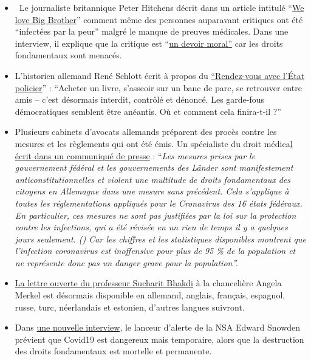 \begin{itemize}
\tightlist
\item
  ~Le journaliste britannique Peter Hitchens décrit dans un article
  intitulé
  ``\href{https://www.firstthings.com/web-exclusives/2020/04/we-love-big-brother}{We
  love Big Brother}'' comment même des personnes auparavant critiques
  ont été ``infectées par la peur'' malgré le manque de preuves
  médicales. Dans une interview, il explique que la critique est
  ``\href{https://www.spiked-online.com/podcast-episode/in-this-lockdown-dissent-is-a-moral-duty/}{un
  devoir moral''} car les droits fondamentaux sont menacés.
\item
  L'historien allemand René Schlott écrit à propos du
  \href{https://www.spiegel.de/politik/deutschland/corona-krise-und-buergerrechte-rendezvous-mit-dem-polizeistaat-a-68611322-f4d4-453f-aba5-5ec5a49ae329}{``Rendez-vous
  avec l'État policier}'' : ``Acheter un livre, s'asseoir sur un banc de
  parc, se retrouver entre amis -- c'est désormais interdit, contrôlé et
  dénoncé. Les garde-fous démocratiques semblent être anéantis. Où et
  comment cela finira-t-il ?''
\item
  Plusieurs cabinets d'avocats allemands préparent des procès contre les
  mesures et les règlements qui ont été émis. Un spécialiste du droit
  médica\href{http://beatebahner.de/lib.medien/aktualisierte\%20Pressemitteilung.pdf}{l
  écrit dans un communiqué de presse} : ``\emph{Les mesures prises par
  le gouvernement fédéral et les gouvernements des Länder sont
  manifestement anticonstitutionnelles et violent une multitude de
  droits fondamentaux des citoyens en Allemagne dans une mesure sans
  précédent. Cela s'applique à toutes les réglementations appliqués pour
  le Cronavirus des 16 états fédéraux. En particulier, ces mesures ne
  sont pas justifiées par la loi sur la protection contre les
  infections, qui a été révisée en un rien de temps il y a quelques
  jours seulement. () Car les chiffres et les statistiques disponibles
  montrent que l'infection coronavirus est inoffensive pour plus de 95
  \% de la population et ne représente donc pas un danger grave pour la
  population''.}
\item
  \href{https://swprs.org/open-letter-from-professor-sucharit-bhakdi-to-german-chancellor-dr-angela-merkel/}{La
  lettre ouverte du professeur Sucharit Bhakdi} à la chancelière Angela
  Merkel est désormais disponible en allemand, anglais, français,
  espagnol, russe, turc, néerlandais et estonien, d'autres langues
  suivront.
\item
  Dans \href{https://www.youtube.com/watch?v=-pcQFTzck_c}{une nouvelle
  interview}, le lanceur d'alerte de la NSA Edward Snowden prévient que
  Covid19 est dangereux mais temporaire, alors que la destruction des
  droits fondamentaux est mortelle et permanente.
\end{itemize}

